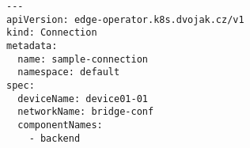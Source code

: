 \begin{lstfloat}
\begin{lstlisting}[style=mybashstyle, caption={Ukázka CRD connection}, label={sample:connection}]
---
apiVersion: edge-operator.k8s.dvojak.cz/v1
kind: Connection
metadata:
  name: sample-connection
  namespace: default
spec:
  deviceName: device01-01
  networkName: bridge-conf
  componentNames:
    - backend
\end{lstlisting}
\end{lstfloat}